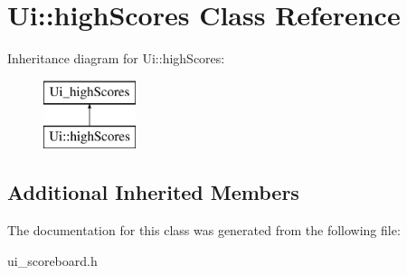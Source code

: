 \hypertarget{classUi_1_1highScores}{\section{Ui\-:\-:high\-Scores Class Reference}
\label{classUi_1_1highScores}
}
Inheritance diagram for Ui\-:\-:high\-Scores\-:\begin{figure}[H]
\begin{center}
\leavevmode
\includegraphics[height=2.000000cm]{classUi_1_1highScores}
\end{center}
\end{figure}
\subsection*{Additional Inherited Members}


The documentation for this class was generated from the following file\-:\begin{DoxyCompactItemize}
\item 
ui\-\_\-scoreboard.\-h\end{DoxyCompactItemize}
